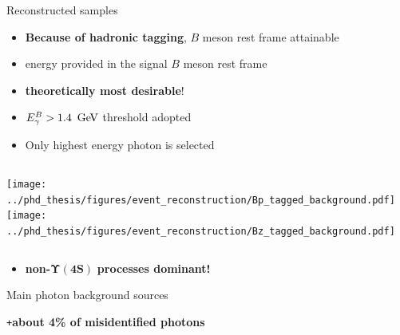 \documentclass[xcolor=dvipsnames]{beamer}
\begin{document}
\begin{frame}{Reconstructed samples}
   \scriptsize
   \begin{itemize}
      \item \textbf{Because of hadronic tagging}, $B$ meson rest frame attainable
      \item[\ra] energy provided in the signal $B$ meson rest frame
      \item[\ra] \textbf{theoretically most desirable}!
      \item ${E^B_{\gamma}}>1.4~\mathrm{\,Ge\kern -0.1em V}$ threshold adopted
      \item Only highest energy photon is selected

   \end{itemize}
   \begin{columns}
      \texttt{[image: ../phd\_thesis/figures/event\_reconstruction/Bp\_tagged\_background.pdf]}
      \texttt{[image: ../phd\_thesis/figures/event\_reconstruction/Bz\_tagged\_background.pdf]}
   \end{columns}
   \begin{itemize}
      \item[\ra] \textbf{non-}$\bm{\Upsilon(4S)}$ \textbf{processes dominant!}
   \end{itemize}
\end{frame}

\begin{frame}{Main photon background sources}
\centering\scriptsize



{\large \texttt{+}\textbf{about 4\% of misidentified photons}}

\end{frame}
\end{document}
